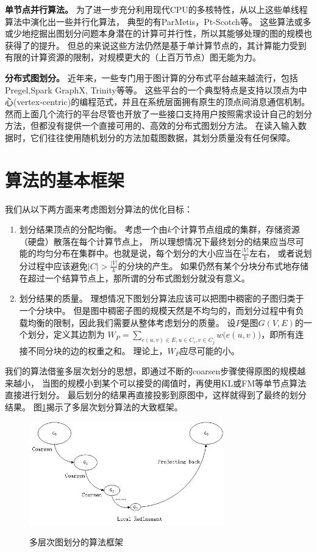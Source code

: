 \documentclass[master]{njuthesis}
\begin{document}
\textbf{单节点并行算法。 } 为了进一步充分利用现代CPU的多核特性，从以上这些单线程算法中演化出一些并行化算法，
典型的有ParMetis\cite{karypis1998parallel}，Pt-Scotch\cite{chevalier2008pt}等。 
这些算法或多或少地挖掘出图划分问题本身潜在的计算可并行性，所以其能够处理的图的规模也获得了的提升。 
但总的来说这些方法仍然是基于单计算节点的，其计算能力受到有限的计算资源的限制，对规模更大的（上百万节点）图无能为力。

\textbf{分布式图划分。 } 近年来，一些专门用于图计算的分布式平台越来越流行，包括Pregel\cite{malewicz2010pregel},Spark GraphX\cite{DBLP:conf/osdi/GonzalezXDCFS14}, Trinity\cite{shao2012trinity}等等。
这些平台的一个典型特点是支持以顶点为中心(vertex-centric)的编程范式，并且在系统层面拥有原生的顶点间消息通信机制。
然而上面几个流行的平台尽管也开放了一些接口支持用户按照需求设计自己的划分方法，但都没有提供一个直接可用的、高效的分布式图划分方法。
在读入输入数据时，它们往往使用随机划分的方法加载图数据，其划分质量没有任何保障。

\section{算法的基本框架}
我们从以下两方面来考虑图划分算法的优化目标：
\begin{enumerate}
 \item 划分结果顶点的分配均衡。 考虑一个由$k$个计算节点组成的集群，存储资源（硬盘）散落在每个计算节点上，
 所以理想情况下最终划分的结果应当尽可能的均匀分布在集群中。也就是说，每个划分的大小应当在$\frac{|V|}{k}$左右，
 或者说划分过程中应该避免$|C| > \frac{|V|}{k}$的分块的产生。
 如果仍然有某个分块分布式地存储在超过一个结算节点上，那所谓的分布式图划分就没有意义。
 \item 划分结果的质量。 理想情况下图划分算法应该可以把图中稠密的子图归类于一个分块中。
 但是图中稠密子图的规模天然是不均匀的，而划分过程中有负载均衡的限制，因此我们需要从整体考虑划分的质量。
 设$P$是图$G(V,E)$的一个划分，定义其边割为
 $W_{P}=\sum\nolimits_{e(u,v) \in E, u \in C_i, v \in C_j} w\big(e(u,v)\big)$，即所有连接不同分块的边的权重之和。
 理论上，$W_P$应尽可能的小。
\end{enumerate}
我们的算法借鉴多层次划分的思想，即通过不断的coarsen步骤使得原图的规模越来越小，
当图的规模小到某个可以接受的阈值时，再使用KL或FM等单节点算法直接进行划分。
最后划分的结果再直接投影到原图中，这样就得到了最终的划分结果。
图\ref{fig:mlp_framework}揭示了多层次划分算法的大致框架。
\begin{figure}[h]
  \centering
  \includegraphics[width= 0.75\textwidth]{figure/coarsen.jpg}\\
  \caption{多层次图划分的算法框架}
   \label{fig:mlp_framework}
\end{figure}
\end{document}
